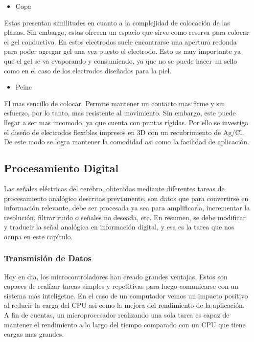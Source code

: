\begin{itemize}
\item Copa
\end{itemize}
Estas presentan similitudes en cuanto a la complejidad de colocación de las planas. Sin embargo, estas ofrecen un espacio que sirve como reserva para colocar el gel conductivo. En estos electrodos suele encontrarse una apertura redonda para poder agregar gel una vez puesto el electrodo. Esto es muy importante ya que el gel se va evaporando y consumiendo, ya que no se puede hacer un sello como en el caso de los electrodos diseñados para la piel.

\begin{itemize}
\item Peine
\end{itemize}
El mas sencillo de colocar. Permite mantener un contacto mas firme y sin esfuerzo, por lo tanto, mas resistente al movimiento. Sin embargo, este puede llegar a ser mas incomodo, ya que cuenta con puntas rígidas. Por ello se investiga el diseño de electrodos flexibles impresos en 3D con un recubrimiento de Ag/Cl. De este modo se logra mantener la comodidad asi como la facilidad de aplicación.

\subsection{Procesamiento Digital}
\label{sec:orgff4716c}
Las señales eléctricas del cerebro, obtenidas mediante diferentes tareas de procesamiento analógico descritas previamente, son datos que para convertirse en información relevante, debe ser procesada ya sea para amplificarla, incrementar la resolución, filtrar ruido o señales no deseada, etc. En resumen, se debe modificar y traducir la señal analógica en información digital, y esa es la tarea que nos ocupa en este capítulo.

\subsubsection{Transmisión de Datos}
\label{sec:org0ca8ce5}
Hoy en dia, los microcontroladores han creado grandes ventajas. Estos son capaces de realizar tareas simples y repetitivas para luego comunicarse con un sistema más inteligetne. En el caso de un computador vemos un impacto positivo al reducir la carga del CPU asi como la mejora del rendimiento de la aplicación. A fin de cuentas, un microprocesador realizando una sola tarea es capaz de mantener el rendimiento a lo largo del tiempo comparado con un CPU que tiene cargas mas grandes.

